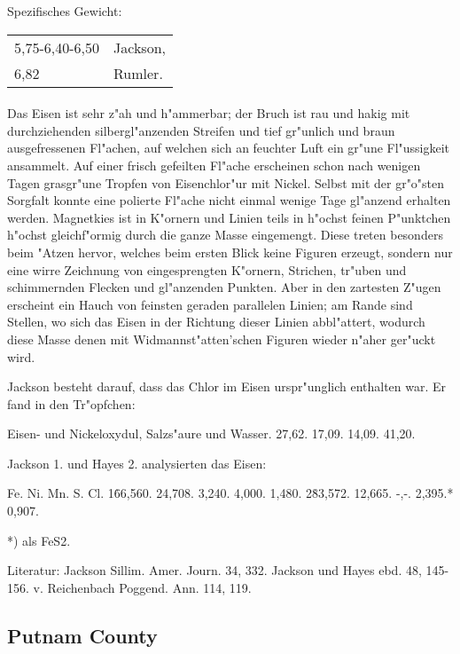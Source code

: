 \documentclass[a4paper, 11pt, oneside]{article}
\begin{document}
Spezifisches Gewicht:
\begin{table}[!ht]
    \centering
    \begin{tabular}{l l}
        5,75-6,40-6,50 & Jackson,\\
        6,82 & Rumler.
    \end{tabular}
\end{table}
\paragraph{}
Das Eisen ist sehr z"ah und h"ammerbar; der Bruch ist rau und hakig mit durchziehenden silbergl"anzenden Streifen und tief gr"unlich und braun ausgefressenen Fl"achen, auf welchen sich an feuchter Luft ein gr"une Fl"ussigkeit ansammelt. Auf einer frisch gefeilten Fl"ache erscheinen schon nach wenigen Tagen grasgr"une Tropfen von Eisenchlor"ur mit Nickel. Selbst mit der gr"o"sten Sorgfalt konnte eine polierte Fl"ache nicht einmal wenige Tage gl"anzend erhalten werden. Magnetkies ist in K"ornern und Linien teils in h"ochst feinen P"unktchen h"ochst gleichf"ormig durch die ganze Masse eingemengt. Diese treten besonders beim "Atzen hervor, welches beim ersten Blick keine Figuren erzeugt, sondern nur eine wirre Zeichnung von eingesprengten K"ornern, Strichen, tr"uben und schimmernden Flecken und gl"anzenden Punkten. Aber in den zartesten Z"ugen erscheint ein Hauch von feinsten geraden parallelen Linien; am Rande sind Stellen, wo sich das Eisen in der Richtung dieser Linien abbl"attert, wodurch diese Masse denen mit Widmannst"atten'schen Figuren wieder n"aher ger"uckt wird.

Jackson besteht darauf, dass das Chlor im Eisen urspr"unglich enthalten war. Er fand in den Tr"opfchen:

Eisen- und Nickeloxydul, Salzs"aure und Wasser.  
27,62. 17,09. 14,09. 41,20.

Jackson 1. und Hayes 2. analysierten das Eisen:

Fe. Ni. Mn. S. Cl.  
1\. 66,560. 24,708. 3,240. 4,000. 1,480.  
2\. 83,572. 12,665. -,-. 2,395.* 0,907.

*) als FeS2.

Literatur: Jackson Sillim. Amer. Journ. 34, 332. Jackson und Hayes ebd. 48, 145-156. v. Reichenbach Poggend. Ann. 114, 119.

\subsection{Putnam County}
\end{document}

